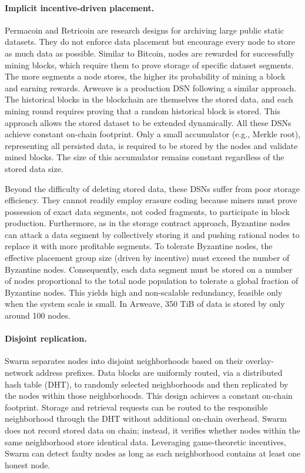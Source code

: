 \paragraph{Implicit incentive-driven placement.}
Permacoin and Retricoin are research designs for archiving large public static datasets.
They do not enforce data placement but encourage every node to store as much data as possible.
Similar to Bitcoin, nodes are rewarded for successfully mining blocks, which require them to prove storage of specific dataset segments.
The more segments a node stores, the higher its probability of mining a block and earning rewards.
Arweave is a production DSN following a similar approach.
The historical blocks in the blockchain are themselves the stored data, and each mining round requires proving that a random historical block is stored.
This approach allows the stored dataset to be extended dynamically.
All these DSNs achieve constant on-chain footprint.
Only a small accumulator (e.g., Merkle root), representing all persisted data, is required to be stored by the nodes and validate mined blocks.
The size of this accumulator remains constant regardless of the stored data size.

Beyond the difficulty of deleting stored data, these DSNs suffer from poor storage efficiency.
They cannot readily employ erasure coding because miners must prove possession of exact data segments, not coded fragments, to participate in block production.
Furthermore, as in the storage contract approach, Byzantine nodes can attack a data segment by collectively storing it and pushing rational nodes to replace it with more profitable segments.
To tolerate Byzantine nodes, the effective placement group size (driven by incentive) must exceed the number of Byzantine nodes.
Consequently, each data segment must be stored on a number of nodes proportional to the total node population to tolerate a global fraction of Byzantine nodes.
This yields high and non-scalable redundancy, feasible only when the system scale is small.
In Arweave, 350 TiB of data is stored by only around 100 nodes.

\paragraph{Disjoint replication.}
Swarm separates nodes into disjoint neighborhoods based on their overlay-network address prefixes.
Data blocks are uniformly routed, via a distributed hash table (DHT), to randomly selected neighborhoods and then replicated by the nodes within those neighborhoods.
This design achieves a constant on-chain footprint.
Storage and retrieval requests can be routed to the responsible neighborhood through the DHT without additional on-chain overhead.
Swarm does not record stored data on chain; instead, it verifies whether nodes within the same neighborhood store identical data.
Leveraging game-theoretic incentives, Swarm can detect faulty nodes as long as each neighborhood contains at least one honest node.

